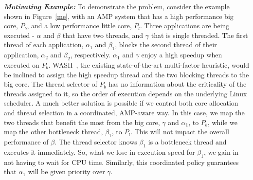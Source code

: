\textbf{\textit{Motivating Example:}} To demonstrate the problem, consider the example shown in Figure~\ref{me}, with an AMP system that has a high performance big core, $P_b$, and a low performance little core, $P_l$. Three applications are being executed - $\alpha$ and $\beta$ that have two threads, and $\gamma$ that is single threaded. 
The first thread of each application, $\alpha_1$ and $\beta_1$, blocks the second thread of their application, $\alpha_2$ and $\beta_2$, respectively. %
$\alpha_1$ and $\gamma$ enjoy a high speedup when executed on $P_b$. WASH~\cite{jibaja2016portable}, the existing state-of-the-art multi-factor heuristic, would be inclined to assign the high speedup thread and the two blocking threads to the big core. The thread selector of $P_b$ has no information about the criticality of the threads assigned to it, so the order of execution depends on the underlying Linux scheduler.
A much better solution is possible if we control both core allocation and thread selection in a coordinated, AMP-aware way. In this case, we map the two threads that benefit the most from the big core, $\gamma$ and $\alpha_1$, to $P_b$, while we map the other bottleneck thread, $\beta_1$, to $P_l$. This will not impact the overall performance of $\beta$. The thread selector knows $\beta_1$ is a bottleneck thread and executes it immediately. So, what we lose in execution speed for $\beta_1$, we gain in not having to wait for CPU time. Similarly, this coordinated policy guarantees that $\alpha_1$ will be given priority over $\gamma$. 


